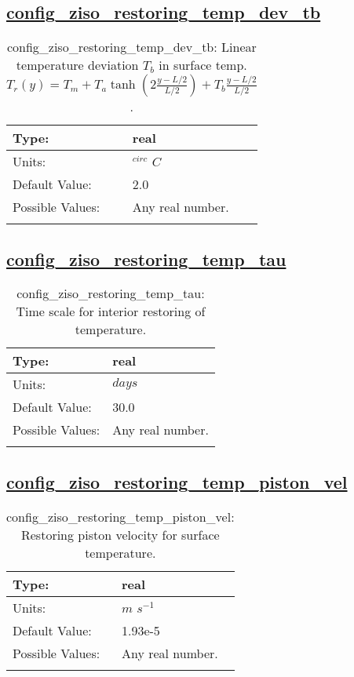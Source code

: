 \subsection[config\_ziso\_restoring\_temp\_dev\_tb]{\hyperref[sec:nm_tab_ziso]{config\_ziso\_restoring\_temp\_dev\_tb}}
\label{subsec:nm_sec_config_ziso_restoring_temp_dev_tb}
\begin{center}
\begin{longtable}{| p{2.0in} || p{4.0in} |}
    \hline
    Type: & real \\
    \hline
    Units: & $^{circ}$ $C$ \\
    \hline
    Default Value: & 2.0 \\
    \hline
    Possible Values: & Any real number. \\
    \hline
    \caption{config\_ziso\_restoring\_temp\_dev\_tb:  Linear temperature deviation  $T_b$  in surface temp.  $T_r(y) = T_m + T_a \tanh\left(2\frac{y-L/2}{L/2}\right) + T_b \frac{y-L/2}{L/2}$ .}
\end{longtable}
\end{center}
\subsection[config\_ziso\_restoring\_temp\_tau]{\hyperref[sec:nm_tab_ziso]{config\_ziso\_restoring\_temp\_tau}}
\label{subsec:nm_sec_config_ziso_restoring_temp_tau}
\begin{center}
\begin{longtable}{| p{2.0in} || p{4.0in} |}
    \hline
    Type: & real \\
    \hline
    Units: & $days$ \\
    \hline
    Default Value: & 30.0 \\
    \hline
    Possible Values: & Any real number. \\
    \hline
    \caption{config\_ziso\_restoring\_temp\_tau: Time scale for interior restoring of temperature.}
\end{longtable}
\end{center}
\subsection[config\_ziso\_restoring\_temp\_piston\_vel]{\hyperref[sec:nm_tab_ziso]{config\_ziso\_restoring\_temp\_piston\_vel}}
\label{subsec:nm_sec_config_ziso_restoring_temp_piston_vel}
\begin{center}
\begin{longtable}{| p{2.0in} || p{4.0in} |}
    \hline
    Type: & real \\
    \hline
    Units: & $m$ $s^{-1}$ \\
    \hline
    Default Value: & 1.93e-5 \\
    \hline
    Possible Values: & Any real number. \\
    \hline
    \caption{config\_ziso\_restoring\_temp\_piston\_vel: Restoring piston velocity for surface temperature.}
\end{longtable}
\end{center}
